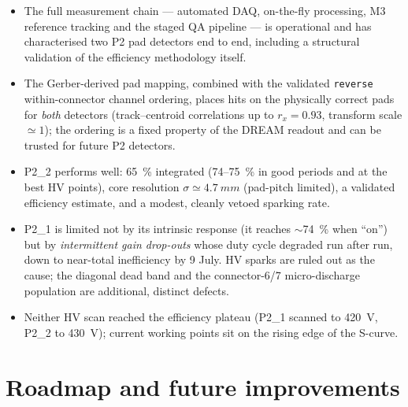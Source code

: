 \documentclass[11pt,a4paper]{article}
\newcommand{\detone}{P2\_1}
\newcommand{\dettwo}{P2\_2}
\newcommand{\code}[1]{\texttt{#1}}
\begin{document}
\begin{itemize}[itemsep=3pt]
  \item The full measurement chain --- automated DAQ, on-the-fly processing,
        M3 reference tracking and the staged QA pipeline --- is operational
        and has characterised two P2 pad detectors end to end, including a
        structural validation of the efficiency methodology itself.
  \item The Gerber-derived pad mapping, combined with the validated
        \code{reverse} within-connector channel ordering, places hits on the
        physically correct pads for \emph{both} detectors (track--centroid
        correlations up to $r_x = 0.93$, transform scale
        $\simeq 1$); the ordering is a fixed property of the DREAM readout
        and can be trusted for future P2 detectors.
  \item \dettwo{} performs well: \SI{65}{\percent} integrated
        (74--\SI{75}{\percent} in good periods and at the best HV points),
        core resolution $\sigma\simeq\SI{4.7}{mm}$ (pad-pitch limited), a
        validated efficiency estimate, and a modest, cleanly vetoed sparking
        rate.
  \item \detone{} is limited not by its intrinsic response (it reaches
        $\sim$\SI{74}{\percent} when ``on'') but by \emph{intermittent gain
        drop-outs} whose duty cycle degraded run after run, down to
        near-total inefficiency by 9 July. HV sparks are ruled out as the
        cause; the diagonal dead band and the connector-6/7 micro-discharge
        population are additional, distinct defects.
  \item Neither HV scan reached the efficiency plateau
        (\detone{} scanned to \SI{420}{V}, \dettwo{} to \SI{430}{V}); current
        working points sit on the rising edge of the S-curve.
\end{itemize}

\section{Roadmap and future improvements}
\label{sec:roadmap}
\end{document}
